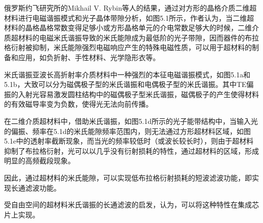 俄罗斯约飞研究所的Mikhail V. Rybin等人的结果，通过对方形的晶格介质二维超材料进行电磁谐振模式和光子晶体带隙分析，如图5.1所示\cite{Rybin2015Phase}，作者认为，当二维超材料的晶格晶格常数变得足够小或方形晶格单元的介电常数足够大的时候，二维介质超材料的电磁米氏谐振导致的米氏能隙成为最低阶的光子带隙，因而器件的布拉格衍射被抑制，米氏能隙强烈电磁响应产生的特殊电磁性质，可以用于超材料的制备和应用，如负折射、手性材料、光学隐形衣等。\cite{Zhao2009Mie,Vynck2009All,Shi2007Effects,Foteinopoulou2012Photonic,Mee2005High,Smith2000Composite,Schurig2006Metamaterial,Munk2002Frequency}

米氏谐振亚波长高折射率介质材料中一种强烈的本征电磁谐振模式，如图5.1a和5.1b，大致可以分为磁偶极子型的米氏谐振和电偶极子型的米氏谐振。其中TE偏振的入射光容易激发圆柱结构中的磁偶极子型米氏谐振，磁偶极子的产生使得材料的有效磁导率变为负数，使得光无法向前传播。

在二维介质超材料中，借助米氏谐振，如图5.1d所示的光子能带结构中，当输入光的偏振、频率在5.1d的米氏能隙频率范围内，则无法通过方形超材料区域，如图5.1e中的透射率截断现象，而当光的频率较低时（或波长较长时），则由于超材料抑制了布拉格衍射，光可以以几乎没有衍射损耗的特性，通过超材料的区域，形成明显的高频截段现象。

因此，通过超材料的米氏能隙，可以实现低布拉格衍射损耗的短波滤波功能，即实现长通滤波功能。

受自由空间的超材料米氏谐振的长通滤波的启发，认为，可以将这种特性在集成芯片上实现。


